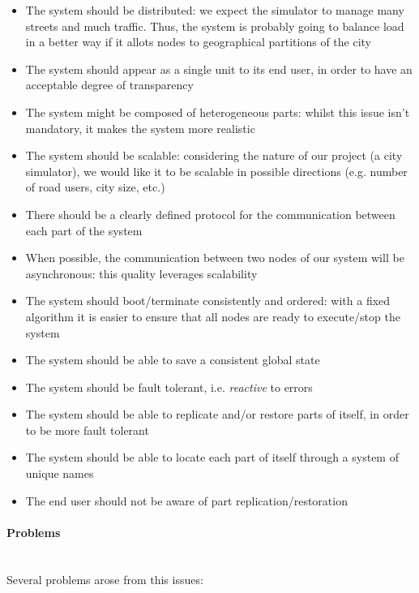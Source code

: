 \begin{itemize}
\item The system should be distributed: we expect the simulator to manage many
  streets and much traffic. Thus, the system is probably going to balance load
  in a better way if it allots nodes to geographical partitions of the city
\item The system should appear as a single unit to its end user, in order to
  have an acceptable degree of transparency
\item The system might be composed of heterogeneous parts: whilst this issue
  isn't mandatory, it makes the system more realistic
\item The system should be scalable: considering the nature of our project (a
  city simulator), we would like it to be scalable in possible directions
  (e.g. number of road users, city size, etc.)
\item There should be a clearly defined protocol for the communication between
  each part of the system
\item When possible, the communication between two nodes of our system will be
  asynchronous: this quality leverages scalability
\item The system should boot/terminate consistently and ordered: with a fixed
  algorithm it is easier to ensure that all nodes are ready to execute/stop the
  system
\item The system should be able to save a consistent global state
\item The system should be fault tolerant, i.e. \emph{reactive} to errors
\item The system should be able to replicate and/or restore parts of itself,
  in order to be more fault tolerant
\item The system should be able to locate each part of itself through a system
  of unique names
\item The end user should not be aware of part replication/restoration
\end{itemize}

\paragraph{Problems} \mbox{} \\

Several problems arose from this issues:

